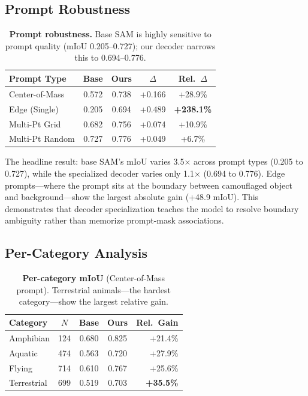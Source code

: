 \subsection{Prompt Robustness}

\begin{table}[t]
\centering
\caption{\textbf{Prompt robustness.} Base SAM is highly sensitive to prompt quality (mIoU 0.205--0.727); our decoder narrows this to 0.694--0.776.}
\label{tab:improvement}
\small
\begin{tabular}{lcccc}
\toprule
Prompt Type & Base & Ours & $\Delta$ & Rel.~$\Delta$ \\
\midrule
Center-of-Mass & 0.572 & 0.738 & +0.166 & +28.9\% \\
Edge (Single) & 0.205 & 0.694 & +0.489 & \textbf{+238.1\%} \\
Multi-Pt Grid & 0.682 & 0.756 & +0.074 & +10.9\% \\
Multi-Pt Random & 0.727 & 0.776 & +0.049 & +6.7\% \\
\bottomrule
\end{tabular}
\end{table}

The headline result: base SAM's mIoU varies 3.5$\times$ across prompt types (0.205 to 0.727), while the specialized decoder varies only 1.1$\times$ (0.694 to 0.776). Edge prompts---where the prompt sits at the boundary between camouflaged object and background---show the largest absolute gain (+48.9 mIoU). This demonstrates that decoder specialization teaches the model to resolve boundary ambiguity rather than memorize prompt-mask associations.

\subsection{Per-Category Analysis}

\begin{table}[t]
\centering
\caption{\textbf{Per-category mIoU} (Center-of-Mass prompt). Terrestrial animals---the hardest category---show the largest relative gain.}
\label{tab:category}
\small
\begin{tabular}{lcccr}
\toprule
Category & $N$ & Base & Ours & Rel.~Gain \\
\midrule
Amphibian & 124 & 0.680 & 0.825 & +21.4\% \\
Aquatic & 474 & 0.563 & 0.720 & +27.9\% \\
Flying & 714 & 0.610 & 0.767 & +25.6\% \\
Terrestrial & 699 & 0.519 & 0.703 & \textbf{+35.5\%} \\
\bottomrule
\end{tabular}
\end{table}

